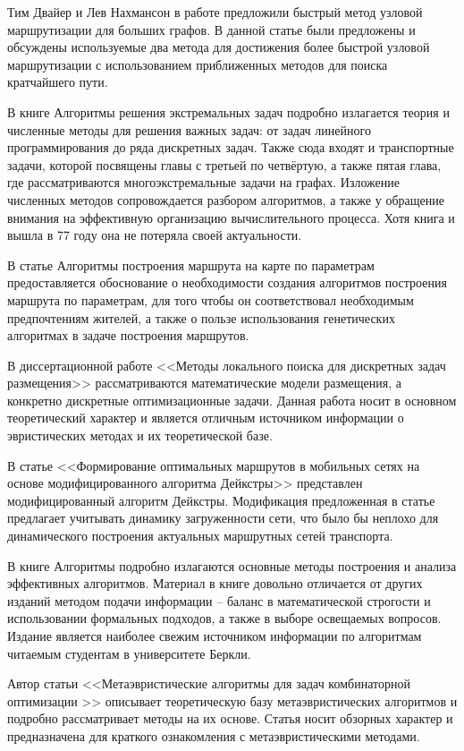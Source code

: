 Тим Двайер и Лев Нахмансон в работе \cite{dwyer2009fast} предложили быстрый метод узловой маршрутизации 
для больших графов. В данной статье были предложены и обсуждены используемые два метода для достижения 
более быстрой узловой маршрутизации с использованием приближенных методов для поиска кратчайшего пути.

В книге Алгоритмы решения экстремальных задач\cite{bib:56} подробно излагается теория и численные методы 
для решения важных задач: от задач линейного программирования до ряда дискретных задач. Также сюда входят 
и транспортные задачи, которой посвящены главы с третьей по четвёртую, а также пятая глава, где 
рассматриваются многоэкстремальные задачи на графах. Изложение численных методов сопровождается разбором 
алгоритмов, а также у обращение внимания на эффективную организацию вычислительного процесса. Хотя книга 
и вышла в 77 году она не потеряла своей актуальности.

В статье Алгоритмы построения маршрута на карте по параметрам\cite{bib:46} предоставляется обоснование 
о необходимости создания алгоритмов построения маршрута по параметрам, для того чтобы он соответствовал 
необходимым предпочтениям жителей, а также о пользе использования генетических алгоритмах в задаче 
построения маршрутов.

В диссертационной работе <<Методы локального поиска для дискретных задач размещения>>\cite{bib:45} 
рассматриваются математические модели размещения, а конкретно дискретные оптимизационные задачи. Данная 
работа носит в основном теоретический характер и является отличным источником информации о эвристических 
методах и их теоретической базе.

В статье <<Формирование оптимальных маршрутов в мобильных сетях на основе модифицированного алгоритма 
Дейкстры>>\cite{bib:55} представлен модифицированный алгоритм Дейкстры. Модификация предложенная в статье 
предлагает учитывать динамику загруженности сети, что было бы неплохо для динамического построения 
актуальных маршрутных сетей транспорта.

В книге Алгоритмы\cite{bib:47} подробно излагаются основные методы построения и анализа эффективных 
алгоритмов. Материал в книге довольно отличается от других изданий методом подачи информации -- баланс в 
математической строгости и использовании формальных подходов, а также в выборе освещаемых вопросов. 
Издание является наиболее свежим источником информации по алгоритмам читаемым студентам в университете Беркли.

Автор статьи <<Метаэвристические алгоритмы для задач комбинаторной оптимизации >>\cite{bib:48} описывает 
теоретическую базу метаэвристических алгоритмов и подробно рассматривает методы на их основе. Статья носит 
обзорных характер и предназначена для краткого ознакомления с метаэвристическими методами.

